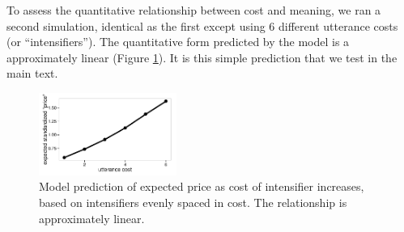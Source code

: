 \documentclass[10pt,letterpaper]{article}
\begin{document}
To assess the quantitative relationship between cost and meaning, we ran a second simulation, identical as the first except using 6 different utterance costs (or ``intensifiers'').
The quantitative form predicted by the model is a approximately linear (Figure \ref{model-heights}).
It is this simple prediction that we test in the main text.

\begin{figure}[tbh]
\begin{center}\includegraphics[width=0.4\textwidth]{height-by-cost.pdf}
\end{center}
\caption{Model prediction of expected price as cost of intensifier increases, based on intensifiers evenly spaced in cost. The relationship is approximately linear.} 
\label{model-heights}
\end{figure}
\end{document}
